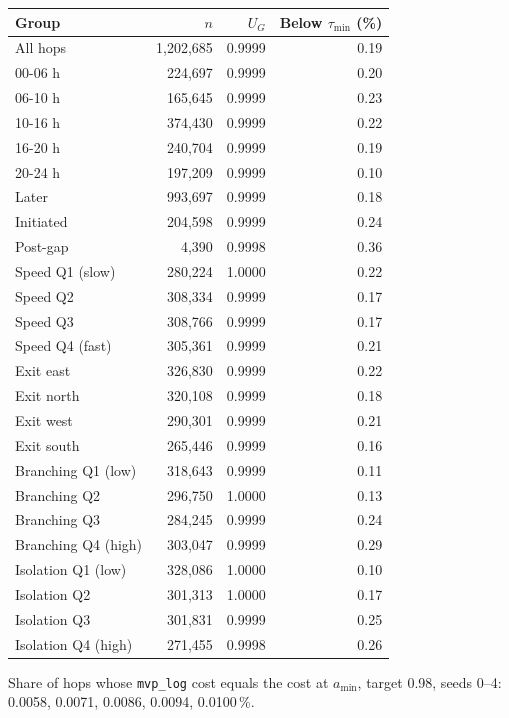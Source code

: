 \begin{tabular}{@{}lrrr@{}}
\toprule
Group & $n$ & $U_G$ & Below $\tau_{\min}$ (\%) \\
\midrule
All hops & 1{,}202{,}685 & 0.9999 & 0.19 \\
00-06 h & 224{,}697 & 0.9999 & 0.20 \\
06-10 h & 165{,}645 & 0.9999 & 0.23 \\
10-16 h & 374{,}430 & 0.9999 & 0.22 \\
16-20 h & 240{,}704 & 0.9999 & 0.19 \\
20-24 h & 197{,}209 & 0.9999 & 0.10 \\
Later & 993{,}697 & 0.9999 & 0.18 \\
Initiated & 204{,}598 & 0.9999 & 0.24 \\
Post-gap & 4{,}390 & 0.9998 & 0.36 \\
Speed Q1 (slow) & 280{,}224 & 1.0000 & 0.22 \\
Speed Q2 & 308{,}334 & 0.9999 & 0.17 \\
Speed Q3 & 308{,}766 & 0.9999 & 0.17 \\
Speed Q4 (fast) & 305{,}361 & 0.9999 & 0.21 \\
Exit east & 326{,}830 & 0.9999 & 0.22 \\
Exit north & 320{,}108 & 0.9999 & 0.18 \\
Exit west & 290{,}301 & 0.9999 & 0.21 \\
Exit south & 265{,}446 & 0.9999 & 0.16 \\
Branching Q1 (low) & 318{,}643 & 0.9999 & 0.11 \\
Branching Q2 & 296{,}750 & 1.0000 & 0.13 \\
Branching Q3 & 284{,}245 & 0.9999 & 0.24 \\
Branching Q4 (high) & 303{,}047 & 0.9999 & 0.29 \\
Isolation Q1 (low) & 328{,}086 & 1.0000 & 0.10 \\
Isolation Q2 & 301{,}313 & 1.0000 & 0.17 \\
Isolation Q3 & 301{,}831 & 0.9999 & 0.25 \\
Isolation Q4 (high) & 271{,}455 & 0.9998 & 0.26 \\
\bottomrule
\end{tabular}

\smallskip\parbox{\columnwidth}{\footnotesize Share of hops whose \texttt{mvp\_log} cost equals the cost at $a_{\min}$, target 0.98, seeds 0--4: 0.0058, 0.0071, 0.0086, 0.0094, 0.0100\,\%.}
